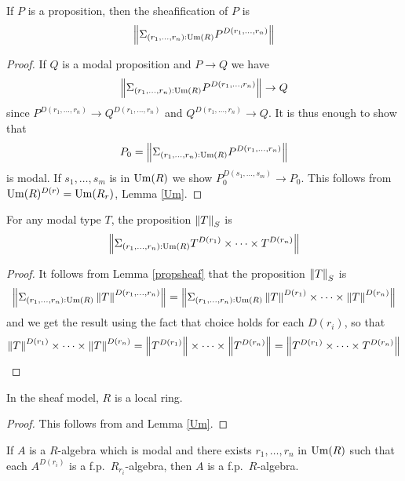     \begin{lemma}\label{propsheaf}
      If $P$ is a proposition, then the sheafification of $P$ is
      $$\left\lVert \Sigma_{(r_1,\dots,r_n):\mathrm{Um}(R)}P^{D(r_1,\dots,r_n)} \right\rVert$$
    \end{lemma}
    
    \begin{proof}
      If $Q$ is a modal proposition and $P\rightarrow Q$ we have
      $$\left\lVert \Sigma_{(r_1,\dots,r_n):\mathrm{Um}(R)}P^{D(r_1,\dots,r_n)} \right\rVert\rightarrow Q$$
      since
      $P^{D(r_1,\dots,r_n)}\rightarrow Q^{D(r_1,\dots,r_n)}$ and $Q^{D(r_1,\dots,r_n)}\rightarrow Q$.
      It is thus enough to show that
      $$P_0 = \left\lVert \Sigma_{(r_1,\dots,r_n):\mathrm{Um}(R)}P^{D(r_1,\dots,r_n)} \right\rVert$$
      is modal.
      If $s_1,\dots,s_m$ is in $\mathrm{Um}(R)$ we show $P_0^{D(s_1,\dots,s_m)}\rightarrow P_0$. This follows
      from $\mathrm{Um}(R)^{D(r)} = \mathrm{Um}(R_r)$, Lemma \ref{Um}.
    \end{proof}
    

    \begin{proposition}\label{norm}
      For any modal type $T$, the proposition $\left\lVert T \right\rVert_S$ is
      $$\left\lVert \Sigma_{(r_1,\dots,r_n):\mathrm{Um}(R)}T^{D(r_1)}\times\dots\times T^{D(r_n)} \right\rVert$$
    \end{proposition}
    
    \begin{proof}
      It follows from Lemma \ref{propsheaf} that the proposition $\left\lVert T \right\rVert_S$ is
      $$\left\lVert \Sigma_{(r_1,\dots,r_n):\mathrm{Um}(R)}\left\lVert T \right\rVert^{D(r_1,\dots,r_n)} \right\rVert = \left\lVert \Sigma_{(r_1,\dots,r_n):\mathrm{Um}(R)}\left\lVert T \right\rVert^{D(r_1)}\times\dots\times\left\lVert T \right\rVert^{D(r_n)} \right\rVert$$
      and we get the result using the fact that choice holds for each $D(r_i)$, so that
      \[\left\lVert T \right\rVert^{D(r_1)}\times\dots\times\left\lVert T \right\rVert^{D(r_n)} = \left\lVert T^{D(r_1)} \right\rVert\times\dots\times\left\lVert T^{D(r_n)} \right\rVert =
        \left\lVert T^{D(r_1)}\times\dots\times T^{D(r_n)} \right\rVert\]
    \end{proof}
    
    \begin{proposition}
      In the sheaf model, $R$ is a local ring.
    \end{proposition}

    \begin{proof}
      This follows from  and Lemma \ref{Um}.
    \end{proof}

    \begin{lemma}\label{localfp}
      If $A$ is a $R$-algebra which is modal and there exists $r_1,\dots,r_n$ in $\mathrm{Um}(R)$ such that each
      $A^{D(r_i)}$ is a f.p.\ $R_{r_i}$-algebra, then $A$ is a f.p.\ $R$-algebra.
    \end{lemma}
    
